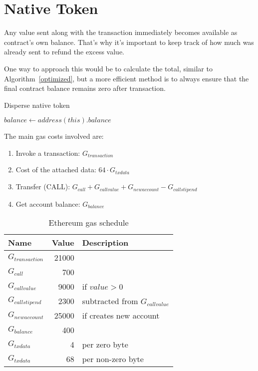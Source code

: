 \documentclass[12pt]{article}
\begin{document}
\newpage
\section{Native Token}

Any value sent along with the transaction immediately becomes available as contract's own balance.
That's why it's important to keep track of how much was already sent to refund the excess value.

One way to approach this would be to calculate the total, similar to Algorithm~\ref{optimized}, but a more efficient method is to always ensure that the final contract balance remains zero after transaction.

\begin{algorithm}[h]
	\label{native}
	\caption{Disperse native token}
	\BlankLine
	\For{$i \in [0 \dots recipients.length)$}{
		recipients[i].transfer(values[i])
	}
	$balance \leftarrow address(this).balance$ \\
\end{algorithm}

The main gas costs involved are:
\begin{enumerate}
	\item Invoke a transaction: $G_{transaction}$
	\item Cost of the attached data: $64 \cdot G_{txdata}$
	\item Transfer (CALL): $G_{call} + G_{callvalue} + G_{newaccount} - G_{callstipend}$
	\item Get account balance: $G_{balance}$
\end{enumerate}

\begin{table}[h]
\caption{Ethereum gas schedule}
\label{gas-costs-2}
\begin{center}
\begin{tabular}{l r l}
	Name & Value & Description \\ \midrule
	$G_{transaction}$ & 21000 \\
	$G_{call}$ & 700 \\
	$G_{callvalue}$ & 9000 & if $value > 0$ \\
	$G_{callstipend}$ & 2300 & subtracted from $G_{callvalue}$ \\
	$G_{newaccount}$ & 25000 & if creates new account \\
	$G_{balance}$ & 400 \\
	$G_{txdata}$ & 4 & per zero byte \\
	$G_{txdata}$ & 68 & per non-zero byte \\

\end{tabular}
\end{center}
\end{table}
\end{document}
